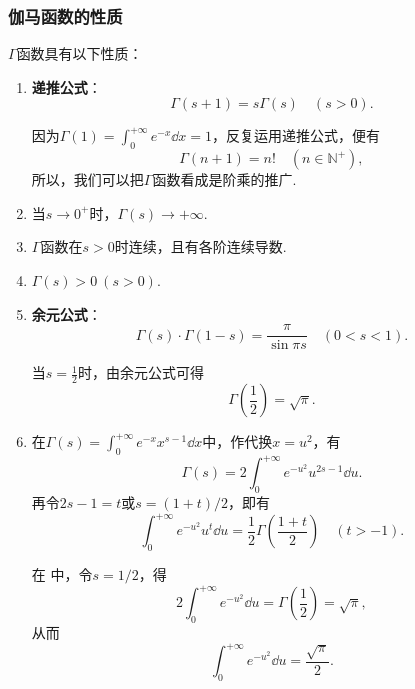 \subsubsection{伽马函数的性质}
\begin{property}
\(\Gamma\)函数具有以下性质：
\begin{enumerate}
\item \textbf{递推公式}：\begin{equation}
\Gamma(s+1) = s \Gamma(s) \quad (s > 0).
\end{equation}

因为\(\Gamma(1) = \int_0^{+\infty} e^{-x} \dd{x} = 1\)，反复运用递推公式，便有\begin{equation}\label{equation:定积分.伽马函数与阶乘的联系}
\Gamma(n+1) = n! \quad (n\in\mathbb{N}^+),
\end{equation}所以，我们可以把\(\Gamma\)函数看成是阶乘的推广.

\item 当\(s\to0^+\)时，\(\Gamma(s) \to +\infty\).

\item \(\Gamma\)函数在\(s > 0\)时连续，且有各阶连续导数.

\item \(\Gamma(s) > 0\ (s>0)\).

\item \textbf{余元公式}：\begin{equation}\label{equation:定积分.余元公式}
\Gamma(s) \cdot \Gamma(1-s) = \frac{\pi}{\sin{\pi s}} \quad (0 < s < 1).
\end{equation}

当\(s = \frac{1}{2}\)时，由余元公式可得\begin{equation}
\Gamma\left(\frac{1}{2}\right) = \sqrt{\pi}.
\end{equation}

\item 在\(\Gamma(s) = \int_0^{+\infty} e^{-x} x^{s-1} \dd{x}\)中，作代换\(x = u^2\)，有\begin{equation}\label{equation:定积分.伽马函数.中间步骤1}
\Gamma(s) = 2 \int_0^{+\infty} e^{-u^2} u^{2s-1} \dd{u}.
\end{equation}
再令\(2s-1 = t\)或\(s = (1+t)/2\)，即有\begin{equation}
\int_0^{+\infty} e^{-u^2} u^t \dd{u}
= \frac{1}{2} \Gamma\left(\frac{1+t}{2}\right)
\quad (t > -1).
\end{equation}

在  中，令\(s=1/2\)，得\[
2\int_0^{+\infty} e^{-u^2} \dd{u}
= \Gamma\left(\frac{1}{2}\right)
= \sqrt{\pi},
\]从而\begin{equation}
\int_0^{+\infty} e^{-u^2} \dd{u} = \frac{\sqrt{\pi}}{2}.
\end{equation}
\end{enumerate}
\end{property}


